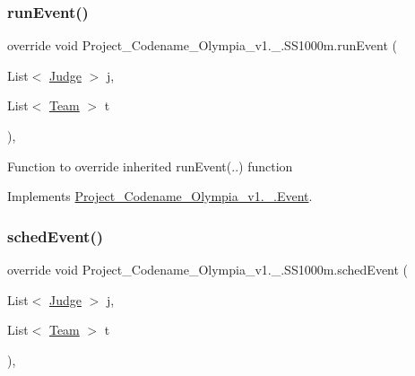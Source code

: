\mbox{\label{classProject__Codename__Olympia__v1_1_1__0_1_1SS1000m_ab08df1d91a7685c6d1dc9bdec0d45fba}} 
\subsubsection{\texorpdfstring{run\+Event()}{runEvent()}}
{\footnotesize\ttfamily override void Project\+\_\+\+Codename\+\_\+\+Olympia\+\_\+v1.\+\_.\+S\+S1000m.\+run\+Event (\begin{DoxyParamCaption}\item[{List$<$ \hyperlink{classProject__Codename__Olympia__v1_1_1__0_1_1Judge}{Judge} $>$}]{j,  }\item[{List$<$ \hyperlink{classProject__Codename__Olympia__v1_1_1__0_1_1Team}{Team} $>$}]{t }\end{DoxyParamCaption})\hspace{0.3cm}{\ttfamily [inline]}, {\ttfamily [virtual]}}

Function to override inherited run\+Event(..) function 

Implements \hyperlink{classProject__Codename__Olympia__v1_1_1__0_1_1Event_ac6ff060da23153c02da49937dcf9f326}{Project\+\_\+\+Codename\+\_\+\+Olympia\+\_\+v1.\+\_.\+Event}.

\mbox{\label{classProject__Codename__Olympia__v1_1_1__0_1_1SS1000m_a4cb7d76aed8d478577e243b187ce4830}} 
\subsubsection{\texorpdfstring{sched\+Event()}{schedEvent()}}
{\footnotesize\ttfamily override void Project\+\_\+\+Codename\+\_\+\+Olympia\+\_\+v1.\+\_.\+S\+S1000m.\+sched\+Event (\begin{DoxyParamCaption}\item[{List$<$ \hyperlink{classProject__Codename__Olympia__v1_1_1__0_1_1Judge}{Judge} $>$}]{j,  }\item[{List$<$ \hyperlink{classProject__Codename__Olympia__v1_1_1__0_1_1Team}{Team} $>$}]{t }\end{DoxyParamCaption})\hspace{0.3cm}{\ttfamily [inline]}, {\ttfamily [virtual]}}

